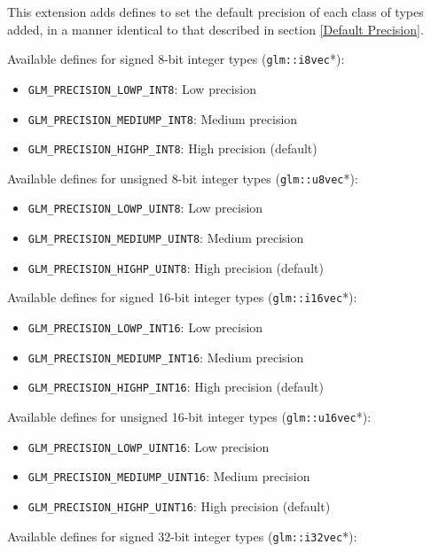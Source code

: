 \documentclass{scrartcl}
\numberwithin{figure}{subsection}
\begin{document}
This extension adds defines to set the default precision of each class of types added, in a manner identical to that described in section \ref{Default Precision}.

Available defines for signed 8-bit integer types (\verb|glm::i8vec|*):

\begin{itemize}
    \item \verb|GLM_PRECISION_LOWP_INT8|: Low precision
    \item \verb|GLM_PRECISION_MEDIUMP_INT8|: Medium precision 
    \item \verb|GLM_PRECISION_HIGHP_INT8|: High precision (default)
\end{itemize}

Available defines for unsigned 8-bit integer types (\verb|glm::u8vec|*):

\begin{itemize}
    \item \verb|GLM_PRECISION_LOWP_UINT8|: Low precision
    \item \verb|GLM_PRECISION_MEDIUMP_UINT8|: Medium precision 
    \item \verb|GLM_PRECISION_HIGHP_UINT8|: High precision (default)
\end{itemize}

Available defines for signed 16-bit integer types (\verb|glm::i16vec|*):

\begin{itemize}
    \item \verb|GLM_PRECISION_LOWP_INT16|: Low precision
    \item \verb|GLM_PRECISION_MEDIUMP_INT16|: Medium precision 
    \item \verb|GLM_PRECISION_HIGHP_INT16|: High precision (default)
\end{itemize}

Available defines for unsigned 16-bit integer types (\verb|glm::u16vec|*):

\begin{itemize}
    \item \verb|GLM_PRECISION_LOWP_UINT16|: Low precision
    \item \verb|GLM_PRECISION_MEDIUMP_UINT16|: Medium precision 
    \item \verb|GLM_PRECISION_HIGHP_UINT16|: High precision (default)
\end{itemize}

Available defines for signed 32-bit integer types (\verb|glm::i32vec|*):
\end{document}
